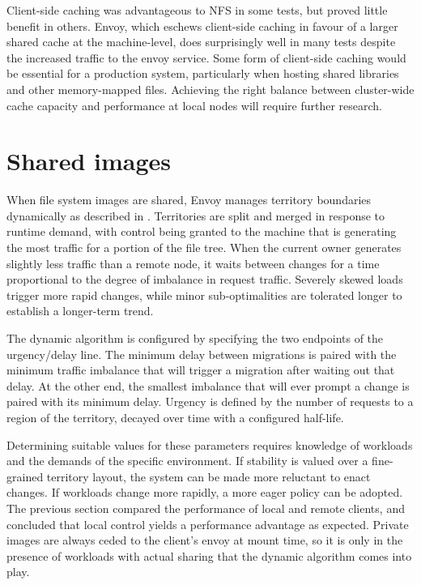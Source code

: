 Client-side caching was advantageous to NFS in some tests, but proved little benefit in others. Envoy, which eschews client-side caching in favour of a larger shared cache at the machine-level, does surprisingly well in many tests despite the increased traffic to the envoy service. Some form of client-side caching would be essential for a production system, particularly when hosting shared libraries and other memory-mapped files. Achieving the right balance between cluster-wide cache capacity and performance at local nodes will require further research.

\section{Shared images}\label{sec:shared-images}

When file system images are shared, Envoy manages territory boundaries dynamically as described in . Territories are split and merged in response to runtime demand, with control being granted to the machine that is generating the most traffic for a portion of the file tree. When the current owner generates slightly less traffic than a remote node, it waits between changes for a time proportional to the degree of imbalance in request traffic. Severely skewed loads trigger more rapid changes, while minor sub-optimalities are tolerated longer to establish a longer-term trend.

The dynamic algorithm is configured by specifying the two endpoints of the urgency/delay line. The minimum delay between migrations is paired with the minimum traffic imbalance that will trigger a migration after waiting out that delay. At the other end, the smallest imbalance that will ever prompt a change is paired with its minimum delay. Urgency is defined by the number of requests to a region of the territory, decayed over time with a configured half-life.

Determining suitable values for these parameters requires knowledge of workloads and the demands of the specific environment. If stability is valued over a fine-grained territory layout, the system can be made more reluctant to enact changes. If workloads change more rapidly, a more eager policy can be adopted. The previous section compared the performance of local and remote clients, and concluded that local control yields a performance advantage as expected. Private images are always ceded to the client's envoy at mount time, so it is only in the presence of workloads with actual sharing that the dynamic algorithm comes into play.

